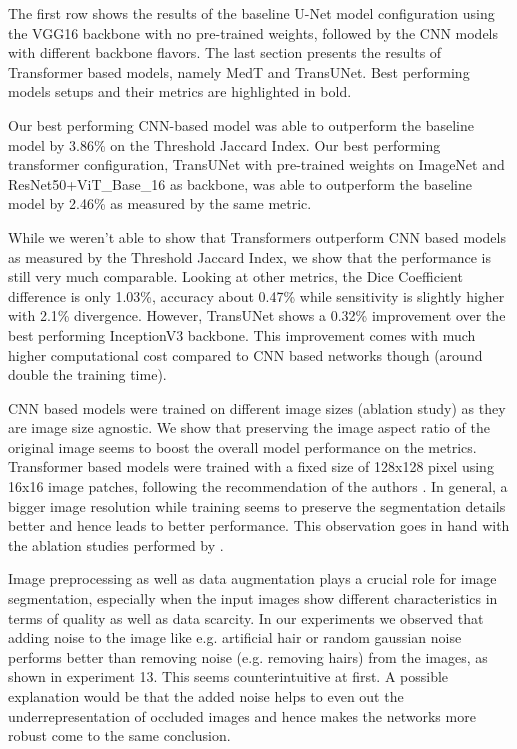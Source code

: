 The first row shows the results of the baseline U-Net model configuration using the VGG16 backbone with no pre-trained weights, followed by the CNN models with different backbone  flavors. The last section presents the results of Transformer based models, namely MedT and TransUNet. Best performing models setups and their metrics are highlighted in bold.
\par
Our best performing CNN-based model was able to outperform the baseline model by 3.86\% on the Threshold Jaccard Index. Our best performing transformer configuration, TransUNet with pre-trained weights on ImageNet and ResNet50+ViT\_Base\_16 as backbone, was able to outperform the baseline model by 2.46\% as measured by the same metric.
\par
While we weren’t able to show that Transformers outperform CNN based models as measured by the Threshold Jaccard Index, we show that the performance is still very much comparable. Looking at other metrics, the Dice Coefficient difference is only 1.03\%, accuracy about 0.47\% while sensitivity is slightly higher with 2.1\% divergence. However, TransUNet shows a 0.32\% improvement over the best performing InceptionV3 backbone. This improvement comes with much higher computational cost compared to CNN based networks though (around double the training time).
\par
CNN based models were trained on different image sizes (ablation study) as they are image size agnostic. We show that preserving the image aspect ratio of the original image seems to boost the overall model performance on the metrics. Transformer based models were trained with a fixed size of 128x128 pixel using 16x16 image patches, following the recommendation of the authors \citep{transunet-2021-chen, medical_transformer-2021-valanarasu}. In general, a bigger image resolution while training seems to preserve the segmentation details better and hence leads to better performance. This observation goes in hand with the ablation studies performed by \citep{transunet-2021-chen}.
\par
Image preprocessing as well as data augmentation plays a crucial role for image segmentation, especially when the input images show different characteristics in terms of quality as well as data scarcity. In our experiments we observed that adding noise to the image like e.g. artificial hair or random gaussian noise performs better than removing noise (e.g. removing hairs) from the images, as shown in experiment 13. This seems counterintuitive at first. A possible explanation would be that the added noise helps to even out the underrepresentation of occluded images and hence makes the networks more robust \citep{skin_segmentation-2019-jahanifar} come to the same conclusion.
